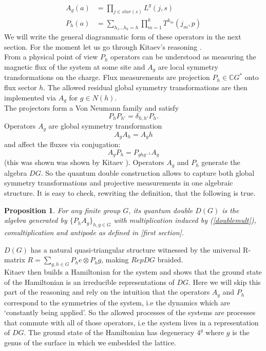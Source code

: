 \documentclass{article}
\newtheorem{proposition}[theorem]{Proposition}
\begin{document}
\begin{equation}\label{doubleonsite}
	\begin{aligned}
	A_g(a) &= \prod_{j \in star(s)} L^g(j,s) \\
	P_h(a) &= \sum_{h_1...h_k=h} \prod_{m=1}^{k} T^{h_m}(j_m,p)
	\end{aligned}
\end{equation}
We will write the general diagrammatic form of these operators in the next section. For the moment let us go through Kitaev's reasoning \cite{Kitaev03}.\\
From a physical point of view $P_h$ operators can be understood as measuring the magnetic flux of the system at some site and $A_g$ are local symmetry transformations on the charge. Flux measurements are projection $P_h \in \mathbb{C}G^*$ onto flux sector $h$. The allowed residual global symmetry transformations are then implemented via $A_g$ for $g \in N(h)$. \\
The projectors form a Von Neumann family and satisfy 
$$P_hP_{h'}= \delta_{h,h'} P_h.$$ 
Operators $A_g$ are global symmetry transformation 
$$A_gA_h = A_gh$$
and affect the fluxes via conjugation:
\begin{equation}\label{doublemult}
A_gP_h = P_{ghg^{-1}}A_g
\end{equation}
(this was shown was shown by Kitaev \cite{Kitaev03}). Operators $A_g$ and $P_h$ generate the algebra $DG$. So the quantum double construction allows to capture both global symmetry transformations and projective measurements in one algebraic structure. It is easy to check, rewriting the definition, that the following is true. 
\begin{proposition}
	For any finite group $G$, its quantum double $D(G)$ is the algebra generated by $\{P_hA_g\}_{h,g\in G}$ with multiplication induced by (\ref{doublemult}), comultiplication and antipode as defined in [first section]. 
\end{proposition}
$D(G)$ has a natural quasi-triangular structure witnessed by the universal R-matrix $R=\sum_{g,h \in G}P_he \otimes P_hg$, making $RepDG$ braided.\\
Kitaev then builds a Hamiltonian for the system and shows that the ground state of the Hamiltonian is an irreducible representations of $DG$. Here we will skip this part of the reasoning and rely on the intuition that the operators $A_g$ and $P_h$ correspond to the symmetries of the system, i.e the dynamics which are `constantly being applied'. So the allowed processes of the systems are processes that commute with all of those operators, i.e the system lives in a representation of $DG$. The ground state of the Hamiltonian has degeneracy $4^g$ where $g$ is the genus of the surface in which we embedded the lattice.\\
\end{document}
